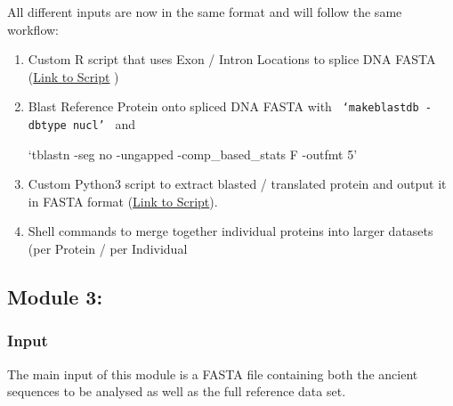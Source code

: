 \documentclass{book}
\begin{document}
\vspace{1.2cm}


{\large All different inputs are now in the same format and will follow the same workflow:}
\vspace{1.2cm}

\begin{enumerate}	
\item Custom R script that uses Exon / Intron Locations to splice DNA FASTA (\href{https://github.com/johnpatramanis/Proteomic_Pipeline/blob/main/Dataset_Construction/R%20scripts/Rscript2.r}{Link to Script} )
\item Blast Reference Protein onto spliced DNA FASTA with \verb| ‘makeblastdb -dbtype nucl’ | and\begin{spverbatim}  ‘tblastn -seg no -ungapped -comp_based_stats F  -outfmt 5’\end{spverbatim}
\item Custom Python3 script to extract blasted / translated protein and output it in FASTA format (\href{https://github.com/johnpatramanis/Proteomic_Pipeline/blob/main/Dataset_Construction/Python%20Scripts/BLAST_EXTRACTOR.py}{Link to Script}).
\item Shell commands to merge together individual proteins into larger datasets (per Protein / per Individual
\end{enumerate}


\vspace{2cm}



















\subsection{\huge Module 3:}

\subsubsection{Input}

The main input of this module is a FASTA file containing both the ancient sequences to be analysed as well as the full reference data set.
\end{document}
